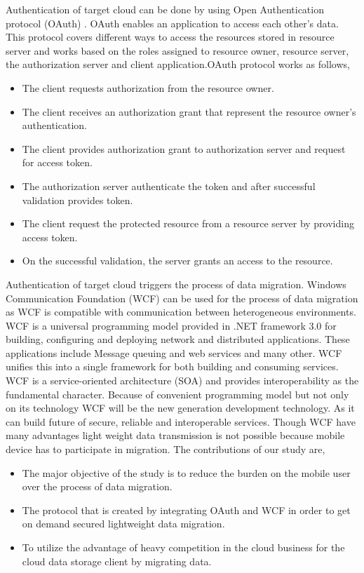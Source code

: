 \documentclass[11pt, pdftex, conference]{IEEEtran}
\begin{document}
\hspace{15mm}Authentication of target cloud can be done by using Open Authentication protocol (OAuth) \cite{14}. OAuth enables an application to access each other’s data.  This protocol covers different ways to access the resources stored in resource server and works based on the roles assigned to resource owner, resource server, the authorization server and client application.\linebreak OAuth protocol works as follows,
\begin{itemize}
\item The client requests authorization from the resource owner.
\item The client receives an authorization grant that represent the resource owner's authentication.
\item The client provides authorization grant to authorization server and request for access token.
\item The authorization server authenticate the token and after successful validation provides token.
\item The client request the protected resource from a resource server by providing access token.
\item On the successful validation, the server grants an access to the resource.
\end{itemize}
\hspace{15mm}Authentication of target cloud triggers the process of data migration. Windows Communication Foundation (WCF) \cite{2} can be used for the process of data migration as WCF is compatible with communication between heterogeneous environments. WCF is a universal programming model provided in .NET framework 3.0 for building\cite{10}, configuring and deploying network and distributed applications. These applications include Message queuing and web services and many other. WCF unifies this into a single framework for both building and consuming services. WCF is a service-oriented architecture (SOA)\cite{11} and provides interoperability as the fundamental character. Because of convenient programming model but not only on its technology WCF will be the new generation development technology. As it can build future of secure, reliable and interoperable services. Though WCF have many advantages light weight data transmission is not possible because mobile device has to participate in migration.
The contributions of our study are,
\begin{itemize}
\item The major objective of the study is to reduce the burden on the mobile user over the process of data migration.
\item The protocol that is created by integrating OAuth and WCF in order to get on demand secured lightweight data migration.
\item To utilize the advantage of heavy competition in the cloud business for the cloud data storage client by migrating data.
\end{itemize}
\end{document}

